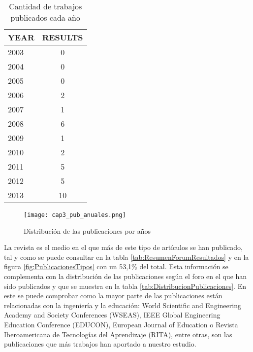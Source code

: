 \begin{table}[H]
  \begin{center}
  \begin{tabular}{| m{4cm} | c |}
    \hline
    YEAR & RESULTS\\
    \hline    
    \hline
    2003 & 0\\
    \hline
    2004 & 0\\
    \hline
    2005 & 0\\
    \hline
    2006 & 2\\
    \hline
    2007 & 1\\
    \hline
    2008 & 6\\
    \hline
    2009 & 1\\
    \hline
    2010 & 2\\
    \hline
    2011 & 5\\
    \hline
    2012 & 5\\
    \hline
    2013 & 10 \\
    \hline
  \end{tabular}
\end{center}
\caption{Cantidad de trabajos publicados cada año}
\label{tab:ResumenAniosResultados}
\end{table} 

\begin{figure}[H]
  \begin{center}
    \texttt{[image: cap3\_pub\_anuales.png]}
  \end{center}
  \caption{Distribución de las publicaciones por años}
  \label{fig:PublicacionesAnuales}
\end{figure}

La revista es el medio en el que más de este tipo de artículos se han publicado, tal y como se puede consultar en la tabla \ref{tab:ResumenForumResultados} y en la figura \ref{fig:PublicacionesTipos} con un 53,1\% del total. Esta información se complementa con la distribución de las publicaciones según el foro en el que han sido publicados y que se muestra en la tabla \ref{tab:DistribucionPublicaciones}. En este se puede comprobar como la mayor parte de las publicaciones están relacionadas con la ingeniería y la educación: World Scientific and Engineering Academy and Society Conferences (WSEAS), IEEE Global Engineering Education Conference (EDUCON), European Journal of Education o Revista Iberoamericana de Tecnologías del Aprendizaje (RITA), entre otras, son las publicaciones que más trabajos han aportado a nuestro estudio.

